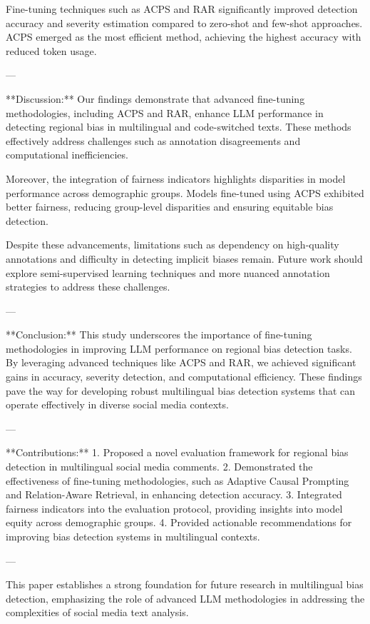 Fine-tuning techniques such as ACPS and RAR significantly improved detection accuracy and severity estimation compared to zero-shot and few-shot approaches. ACPS emerged as the most efficient method, achieving the highest accuracy with reduced token usage.  

---

**Discussion:**  
Our findings demonstrate that advanced fine-tuning methodologies, including ACPS and RAR, enhance LLM performance in detecting regional bias in multilingual and code-switched texts. These methods effectively address challenges such as annotation disagreements and computational inefficiencies.  

Moreover, the integration of fairness indicators highlights disparities in model performance across demographic groups. Models fine-tuned using ACPS exhibited better fairness, reducing group-level disparities and ensuring equitable bias detection.  

Despite these advancements, limitations such as dependency on high-quality annotations and difficulty in detecting implicit biases remain. Future work should explore semi-supervised learning techniques and more nuanced annotation strategies to address these challenges.  

---

**Conclusion:**  
This study underscores the importance of fine-tuning methodologies in improving LLM performance on regional bias detection tasks. By leveraging advanced techniques like ACPS and RAR, we achieved significant gains in accuracy, severity detection, and computational efficiency. These findings pave the way for developing robust multilingual bias detection systems that can operate effectively in diverse social media contexts.  

---

**Contributions:**  
1. Proposed a novel evaluation framework for regional bias detection in multilingual social media comments.  
2. Demonstrated the effectiveness of fine-tuning methodologies, such as Adaptive Causal Prompting and Relation-Aware Retrieval, in enhancing detection accuracy.  
3. Integrated fairness indicators into the evaluation protocol, providing insights into model equity across demographic groups.  
4. Provided actionable recommendations for improving bias detection systems in multilingual contexts.  

---  

This paper establishes a strong foundation for future research in multilingual bias detection, emphasizing the role of advanced LLM methodologies in addressing the complexities of social media text analysis.  